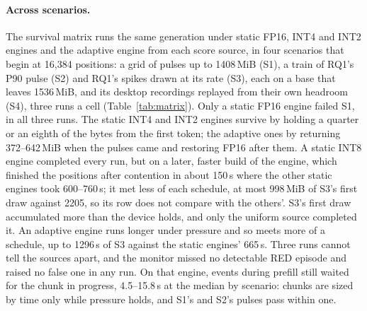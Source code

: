 \documentclass{article}
\begin{document}
\paragraph{Across scenarios.} The survival matrix runs the same generation under
static FP16, INT4 and INT2 engines and the adaptive engine from each score
source, in four scenarios that begin at 16{,}384 positions: a grid of pulses up
to 1408\,MiB (S1), a train of RQ1's P90 pulse (S2) and RQ1's spikes drawn at
its rate (S3), each on a base that leaves 1536\,MiB, and its desktop
recordings replayed from their own headroom (S4), three runs a cell
(Table~\ref{tab:matrix}). Only a static FP16 engine failed S1, in all three
runs. The static INT4 and INT2 engines survive by holding a quarter or an
eighth of the bytes from the first token; the adaptive ones by returning
372--642\,MiB when the pulses came and restoring FP16 after them. A static
INT8 engine completed every run, but on a later, faster build of the engine,
which finished the positions after contention in about 150\,s where the other
static engines took 600--760\,s; it met less of each schedule, at most 998\,MiB of S3's first
draw against 2205, so its row does not compare with the others'. S3's first
draw accumulated more than the device holds, and only the uniform source
completed it. An adaptive engine runs longer under pressure and so meets more
of a schedule, up to 1296\,s of S3 against the static engines' 665\,s. Three
runs cannot tell the sources apart, and the monitor missed no detectable RED
episode and raised no false one in any run. On that engine, events during
prefill still waited for the chunk in progress, 4.5--15.8\,s at the median by
scenario: chunks are sized by time only while pressure holds, and S1's and S2's
pulses pass within one.
\end{document}
